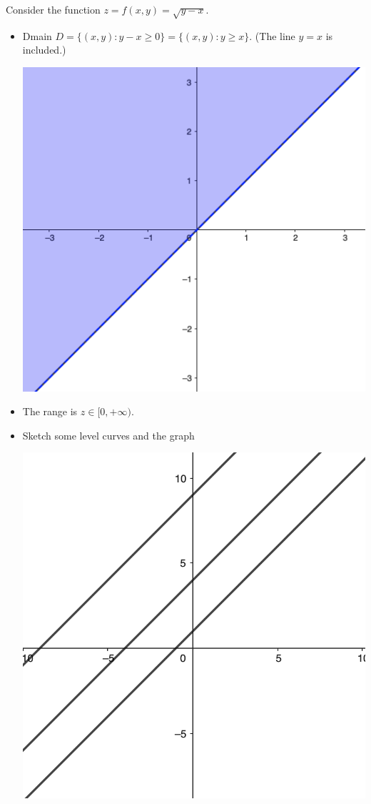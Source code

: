 \begin{example} Consider the function $z=f(x,y) = \sqrt{y-x}$.
    \begin{itemize}
        \item[(a)] Dmain $D = \{(x,y): y-x\geq 0\}=\{(x,y): y\geq x\}$. (The line $y=x$ is included.)
        \begin{center}
            \includegraphics[scale=0.3]{images/11-ex4-a.png}
        \end{center}
        \item[(b)] The range is $z\in [0,+\infty)$.
        \item[(c)] Sketch some level curves and the graph
        \begin{center}
            \includegraphics[scale=0.4]{images/11-ex4-b.png}

\end{center}
\end{itemize}
\end{example}
